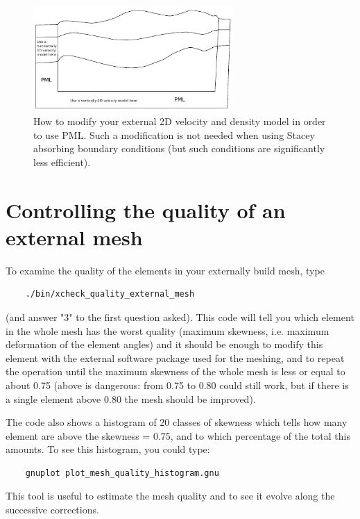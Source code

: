 \documentclass[oneside,english,onecolumn,letterpaper]{book}
\begin{document}
\begin{figure}[htbp]
\centering
\includegraphics[width=3in]{figures/how_to_use_PML_with_external_velocity_model}
\caption{How to modify your external 2D velocity and density model in order to use PML.
Such a modification is not needed when using Stacey absorbing boundary conditions (but such conditions
are significantly less efficient).}
\label{fig:modify_external_velocity_model_to_use_PML}
\end{figure}

\section{Controlling the quality of an external mesh}

To examine the quality of the elements in your externally build mesh, type
%
\begin{verbatim}
    ./bin/xcheck_quality_external_mesh
\end{verbatim}
%
(and answer "3" to the first question asked).
This code will tell you which element in the whole mesh has the worst quality (maximum skewness, i.e. maximum deformation of the element angles) and it should be enough to modify this element with the external software package used for the meshing, and
to repeat the operation until the maximum skewness of the whole mesh is less or equal to about 0.75 (above is dangerous: from 0.75 to 0.80 could still work, but if there is a single element above 0.80 the mesh should be improved).

The code also shows a histogram of 20 classes of skewness which tells how many element are above the skewness = 0.75, and to which percentage of the total this amounts. To see this histogram, you could type:
%
\begin{verbatim}
    gnuplot plot_mesh_quality_histogram.gnu
\end{verbatim}
%
This tool is useful to estimate the mesh quality and to see it evolve along the successive corrections.
\end{document}
